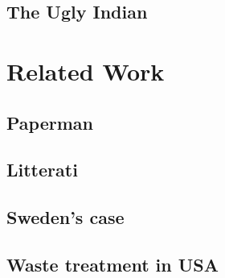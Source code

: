 \documentclass[10pt]{article}
\begin{document}
\subsection{The Ugly Indian}

\section{Related Work}

\subsection {Paperman}

\subsection{Litterati}

\subsection{Sweden's case}

\subsection{Waste treatment in USA}
\end{document}
